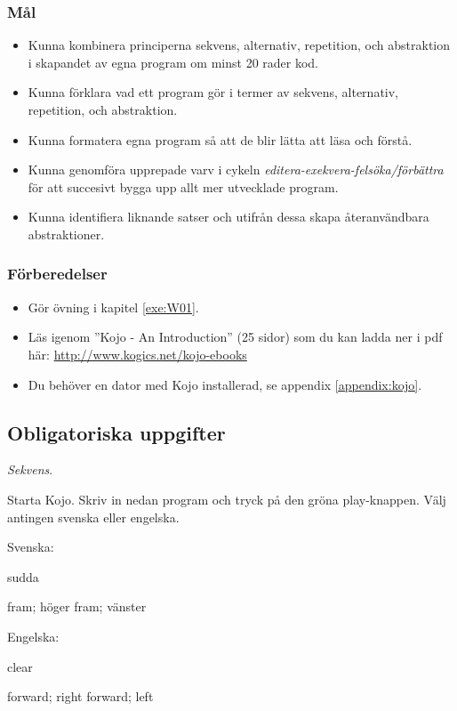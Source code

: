 
\Lab{\LabWeekONE}

\subsubsection{Mål}
\begin{itemize}[nosep]
\item Kunna kombinera principerna sekvens, alternativ, repetition, och abstraktion i skapandet av egna program om minst 20 rader kod.
\item Kunna förklara vad ett program gör i termer av sekvens, alternativ, repetition, och abstraktion.
\item Kunna formatera egna program så att de blir lätta att läsa och förstå.
\item Kunna genomföra upprepade varv i cykeln \emph{editera-exekvera-felsöka/förbättra} för att succesivt bygga upp allt mer utvecklade program. 
\item Kunna identifiera liknande satser och utifrån dessa skapa återanvändbara abstraktioner.
\end{itemize}

\subsubsection{Förberedelser}
\begin{itemize}[nosep]
\item Gör övning {\tt \ExeWeekONE} i kapitel \ref{exe:W01}.
\item Läs igenom ''Kojo - An Introduction'' (25 sidor) som du kan ladda ner i pdf  här: \href{http://www.kogics.net/kojo-ebooks}{http://www.kogics.net/kojo-ebooks}
\item Du behöver en dator med Kojo installerad, se appendix \ref{appendix:kojo}.
\end{itemize}

\subsection{Obligatoriska uppgifter}


\Task \textit{Sekvens}. 

\Subtask Starta Kojo. Skriv in nedan program och tryck på den gröna play-knappen. Välj antingen svenska eller engelska. 

\begin{multicols}{2}
\noindent Svenska:
\begin{Code}
sudda

fram; höger
fram; vänster
\end{Code}

\columnbreak
\noindent Engelska:
\begin{Code}
clear

forward; right
forward; left
\end{Code}


\end{multicols}

